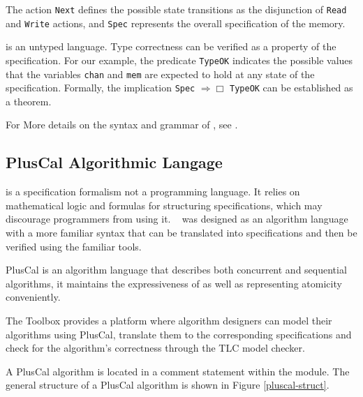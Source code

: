 The action \verb|Next| defines the possible state transitions as the disjunction of \verb|Read| and \verb|Write| actions, and \verb|Spec| represents the overall specification of the memory.

\tlaplus is an untyped language. Type correctness can be verified as a property of the specification. For our example, the predicate \verb|TypeOK| indicates the possible values that the variables \verb|chan| and \verb|mem| are expected to hold at any state of the specification. Formally, the implication \verb|Spec| $\Rightarrow \Box$ \verb|TypeOK| can be established as a theorem.

\bigskip


For More details on the syntax and grammar of \tlaplus, see \cite{tlabook} \cite{tlaplus}.

\subsection{PlusCal Algorithmic Langage}

\tlaplus is a specification formalism not a programming language. It relies on mathematical logic and formulas for structuring specifications, which may discourage programmers from using it.
\newline
{} ~\cite{pcalAlgo} was designed as an algorithm language with a more familiar syntax that can be translated into \tlaplus specifications and then be verified using the familiar \tlaplus tools.

PlusCal is an algorithm language that describes both concurrent and sequential algorithms, it maintains the expressiveness of \tlaplus as well as representing atomicity conveniently.

The \tlaplus Toolbox provides a platform where algorithm designers can model their algorithms using PlusCal, translate them to the corresponding \tlaplus specifications and check for the algorithm's correctness through the TLC model checker.

A PlusCal algorithm is located in a comment statement within the \tlaplus module. The general structure of a PlusCal algorithm is shown in Figure \ref{pluscal-struct}.

